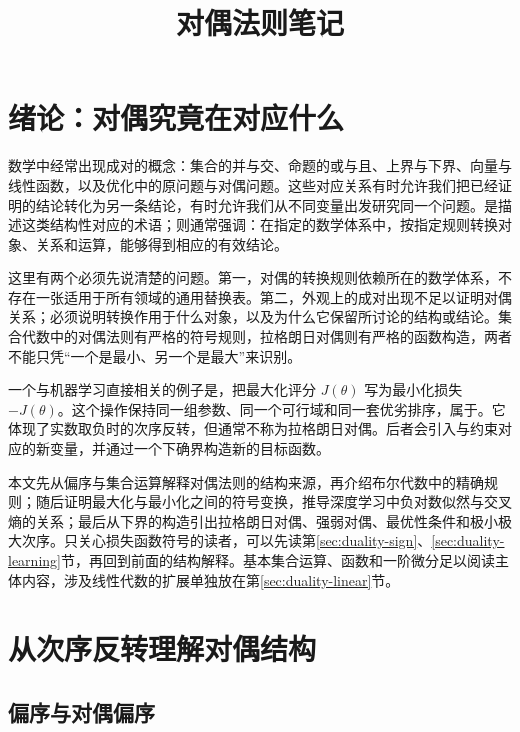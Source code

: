\documentclass[UTF8]{ctexart}
\title{对偶法则笔记}
\author{}
\date{}
\begin{document}
\maketitle
\tableofcontents

\section{绪论：对偶究竟在对应什么}
\label{sec:duality-introduction}

数学中经常出现成对的概念：集合的并与交、命题的或与且、上界与下界、向量与线性函数，以及优化中的原问题与对偶问题。这些对应关系有时允许我们把已经证明的结论转化为另一条结论，有时允许我们从不同变量出发研究同一个问题。是描述这类结构性对应的术语；则通常强调：在指定的数学体系中，按指定规则转换对象、关系和运算，能够得到相应的有效结论。

这里有两个必须先说清楚的问题。第一，对偶的转换规则依赖所在的数学体系，不存在一张适用于所有领域的通用替换表。第二，外观上的成对出现不足以证明对偶关系；必须说明转换作用于什么对象，以及为什么它保留所讨论的结构或结论。集合代数中的对偶法则有严格的符号规则，拉格朗日对偶则有严格的函数构造，两者不能只凭“一个是最小、另一个是最大”来识别。

一个与机器学习直接相关的例子是，把最大化评分 $J(\theta)$ 写为最小化损失 $-J(\theta)$。这个操作保持同一组参数、同一个可行域和同一套优劣排序，属于。它体现了实数取负时的次序反转，但通常不称为拉格朗日对偶。后者会引入与约束对应的新变量，并通过一个下确界构造新的目标函数。

本文先从偏序与集合运算解释对偶法则的结构来源，再介绍布尔代数中的精确规则；随后证明最大化与最小化之间的符号变换，推导深度学习中负对数似然与交叉熵的关系；最后从下界的构造引出拉格朗日对偶、强弱对偶、最优性条件和极小极大次序。只关心损失函数符号的读者，可以先读第\ref{sec:duality-sign}、\ref{sec:duality-learning}节，再回到前面的结构解释。基本集合运算、函数和一阶微分足以阅读主体内容，涉及线性代数的扩展单独放在第\ref{sec:duality-linear}节。

\section{从次序反转理解对偶结构}
\label{sec:duality-order}

\subsection{偏序与对偶偏序}
\end{document}
